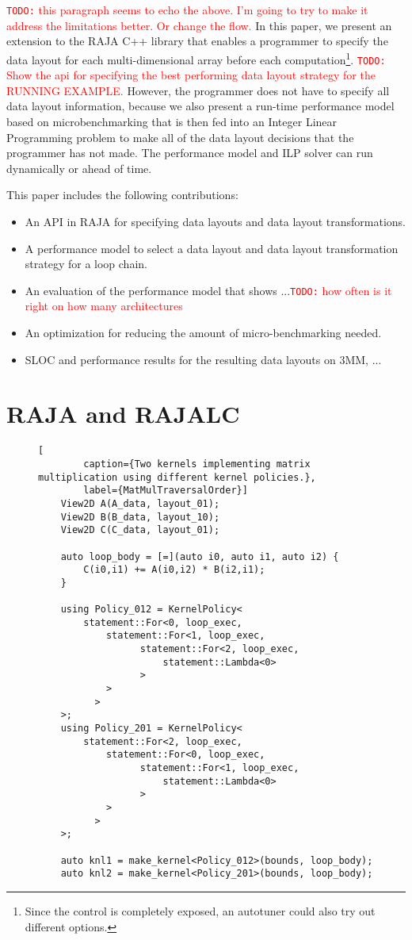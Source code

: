 \documentclass[sigconf, table]{acmart}
\newcommand{\todo}[1]{{\textcolor{red}{{\tt{TODO:}}\,\,#1 }}}
\begin{document}
\todo{this paragraph seems to echo the above. I'm going to try to make it address the limitations better. Or change the flow.}
In this paper, we present an extension to the RAJA C++ library that enables a programmer
to specify the data layout for each multi-dimensional array before each 
computation\footnote{Since the control is completely exposed, an autotuner could also try out different options.}.
\todo{Show the api for specifying the best performing data layout strategy
for the RUNNING EXAMPLE.}
However, the programmer does not have to specify all data layout information, because
we also present a run-time performance model based on microbenchmarking that is
then fed into an Integer Linear Programming problem to make all of the data layout decisions
that the programmer has not made.
The performance model and ILP solver can run dynamically or ahead of time.

This paper includes the following contributions:
\begin{itemize}
\item An API in RAJA for specifying data layouts and data layout transformations.
\item A performance model to select a data layout and data layout transformation strategy for 
         a loop chain.
\item An evaluation of the performance model that shows ...\todo{how often is it right on how many architectures}
\item An optimization for reducing the amount of micro-benchmarking needed.
\item SLOC and performance results for the resulting data layouts on 3MM, ...
\end{itemize} 


\section{RAJA and RAJALC}

\begin{figure}
	\begin{lstlisting}[
		caption={Two kernels implementing matrix multiplication using different kernel policies.},
		label={MatMulTraversalOrder}]
	View2D A(A_data, layout_01);
	View2D B(B_data, layout_10);
	View2D C(C_data, layout_01);
	
	auto loop_body = [=](auto i0, auto i1, auto i2) {
		C(i0,i1) += A(i0,i2) * B(i2,i1);
	}
	
	using Policy_012 = KernelPolicy<
		statement::For<0, loop_exec,
			statement::For<1, loop_exec,
				  statement::For<2, loop_exec,
					  statement::Lambda<0>
				  >
			>
		  >
	>;
	using Policy_201 = KernelPolicy<
		statement::For<2, loop_exec,
			statement::For<0, loop_exec,
				  statement::For<1, loop_exec,
					  statement::Lambda<0>
				  >
			>
		  >
	>;
	
	auto knl1 = make_kernel<Policy_012>(bounds, loop_body);
	auto knl2 = make_kernel<Policy_201>(bounds, loop_body);
	\end{lstlisting}
\end{figure}
\end{document}
